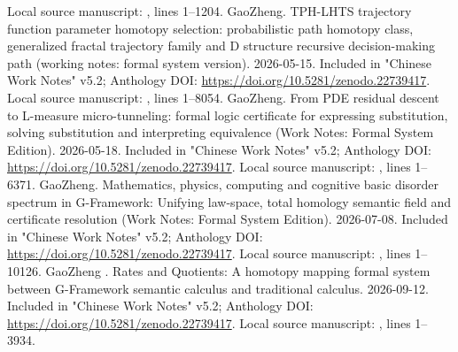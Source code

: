 \documentclass[11pt,a4paper]{article}
\theoremstyle{plain}
\theoremstyle{definition}
\theoremstyle{remark}
\begin{document}
\begin{CJK*}
\begin{thebibliography}
Local source manuscript: , lines 1--1204.  GaoZheng. TPH-LHTS trajectory function parameter homotopy selection: probabilistic path homotopy class, generalized fractal trajectory family and D structure recursive decision-making path (working notes: formal system version). 2026-05-15.\newblock
Included in "Chinese Work Notes" v5.2; Anthology DOI: \url{https://doi.org/10.5281/zenodo.22739417}.\newblock
Local source manuscript: , lines 1--8054.  GaoZheng. From PDE residual descent to L-measure micro-tunneling: formal logic certificate for expressing substitution, solving substitution and interpreting equivalence (Work Notes: Formal System Edition). 2026-05-18.\newblock
Included in "Chinese Work Notes" v5.2; Anthology DOI: \url{https://doi.org/10.5281/zenodo.22739417}.\newblock
Local source manuscript: , lines 1--6371.  GaoZheng. Mathematics, physics, computing and cognitive basic disorder spectrum in G-Framework: Unifying law-space, total homology semantic field and certificate resolution (Work Notes: Formal System Edition). 2026-07-08.\newblock
Included in "Chinese Work Notes" v5.2; Anthology DOI: \url{https://doi.org/10.5281/zenodo.22739417}.\newblock
Local source manuscript: , lines 1--10126.  GaoZheng . Rates and Quotients: A homotopy mapping formal system between G-Framework semantic calculus and traditional calculus. 2026-09-12.\newblock
Included in "Chinese Work Notes" v5.2; Anthology DOI: \url{https://doi.org/10.5281/zenodo.22739417}.\newblock
Local source manuscript: , lines 1--3934.\end{thebibliography}
\clearpage\end{CJK*}
\end{document}
